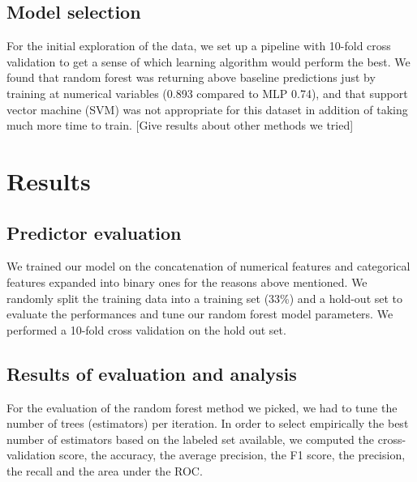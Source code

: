 \documentclass[11pt,a4paper]{article}
\begin{document}
\subsection{Model selection}

For the initial exploration of the data, we set up a pipeline with 10-fold cross validation to get a sense of which learning algorithm would perform the best. We found that random forest was returning above baseline predictions just by training at numerical variables (0.893 compared to MLP 0.74), and that support vector machine (SVM) was not appropriate for this dataset in addition of taking much more time to train. [Give results about other methods we tried]
  
\section{Results}

\subsection{Predictor evaluation}

We trained our model on the concatenation of numerical features and categorical features expanded into binary ones for the reasons above mentioned. We randomly split the training data into a training set (33\%) and a hold-out set to evaluate the performances and tune our random forest model parameters. We performed a 10-fold cross validation on the hold out set.

\subsection{Results of evaluation and analysis}

For the evaluation of the random forest method we picked, we had to tune the number of trees (estimators) per iteration. In order to select empirically the best number of estimators based on the labeled set available, we computed the cross-validation score, the accuracy, the average precision, the F1 score, the precision, the recall and the area under the ROC.
\end{document}
